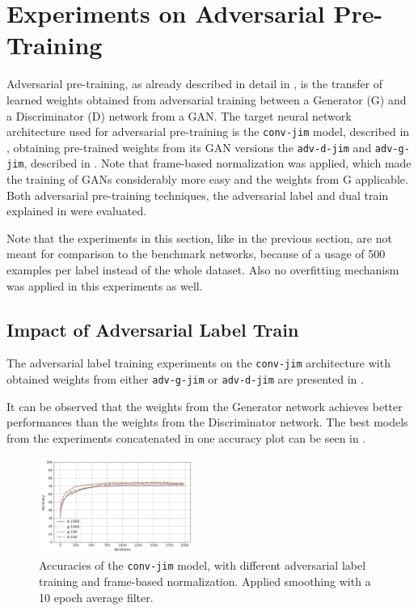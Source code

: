 
\section{Experiments on Adversarial Pre-Training}\label{sec:exp_adv}
\thesisStateRevised
Adversarial pre-training, as already described in detail in , is the transfer of learned weights obtained from adversarial training between a Generator (G) and a Discriminator (D) network from a GAN.
The target neural network architecture used for adversarial pre-training is the \texttt{conv-jim} model, described in , obtaining pre-trained weights from its GAN versions the \texttt{adv-d-jim} and \texttt{adv-g-jim}, described in .
Note that frame-based normalization was applied, which made the training of GANs considerably more easy and the weights from G applicable.
Both adversarial pre-training techniques, the adversarial label and dual train explained in  were evaluated.

Note that the experiments in this section, like in the previous section, are not meant for comparison to the benchmark networks, because of a usage of 500 examples per label instead of the whole dataset.
Also no overfitting mechanism was applied in this experiments as well.



\subsection{Impact of Adversarial Label Train}\label{sec:exp_adv_label}
The adversarial label training experiments on the \texttt{conv-jim} architecture with obtained weights from either \texttt{adv-g-jim} or \texttt{adv-d-jim} are presented in .

It can be observed that the weights from the Generator network achieves better performances than the weights from the Discriminator network.
The best models from the experiments concatenated in one accuracy plot can be seen in .
\begin{figure}[!ht]
  \centering
  \includegraphics[width=0.45\textwidth]{./5_exp/figs/exp_adv_label_acc_conv-jim.png}
  \caption{Accuracies of the \texttt{conv-jim} model, with different adversarial label training and frame-based normalization. Applied smoothing with a 10 epoch average filter.}
  \label{fig:exp_adv_label_acc_conv-jim}
\end{figure}
\FloatBarrier
\noindent

